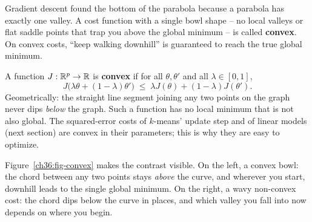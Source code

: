 Gradient descent found the bottom of the parabola because a parabola has exactly
one valley. A cost function with a single bowl shape -- no local valleys or flat
saddle points that trap you above the global minimum -- is called \textbf{convex}.
On convex costs, ``keep walking downhill'' is guaranteed to reach the true global minimum.

\begin{formalbox}
A function $J:\mathbb{R}^p\to\mathbb{R}$ is \textbf{convex} if for all $\theta,\theta'$ and all
$\lambda\in[0,1]$,
\[
  J\big(\lambda\theta + (1-\lambda)\theta'\big)
  \;\le\;
  \lambda J(\theta) + (1-\lambda) J(\theta').
\]
Geometrically: the straight line segment joining any two points on the graph
never dips \emph{below} the graph. Such a function has no local minimum that is
not also global. The squared-error costs of $k$-means' update step and of linear
models (next section) are convex in their parameters; this is why they are easy
to optimize.
\end{formalbox}

Figure~\ref{ch36:fig-convex} makes the contrast visible. On the left, a convex
bowl: the chord between any two points stays \emph{above} the curve, and wherever
you start, downhill leads to the single global minimum. On the right, a wavy
non-convex cost: the chord dips below the curve in places, and which valley you
fall into now depends on where you begin.

